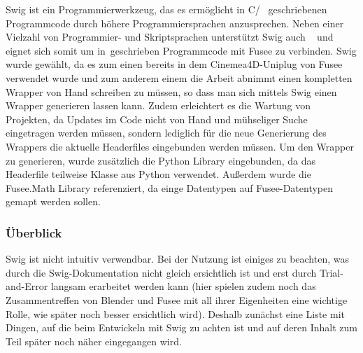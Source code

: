  \label{sec:Umsetzung}



\label{sec:SWIG}

Swig ist ein Programmierwerkzeug, das es ermöglicht in C/\CC~ geschriebenen Programmcode durch höhere Programmiersprachen anzusprechen. Neben einer Vielzahl von Programmier- und Skriptsprachen unterstützt Swig auch \CS~ und eignet sich somit um in\CC~geschrieben Programmcode mit Fusee zu verbinden. Swig wurde gewählt, da es zum einen bereits in dem Cinemea4D-Uniplug von Fusee verwendet wurde und zum anderem einem die Arbeit abnimmt einen kompletten Wrapper von Hand schreiben zu müssen, so dass man sich mittels Swig einen Wrapper generieren lassen kann. Zudem erleichtert es die Wartung von Projekten, da Updates im Code nicht von Hand und mühseliger Suche eingetragen werden müssen, sondern lediglich für die neue Generierung des Wrappers die aktuelle Headerfiles eingebunden werden müssen.
Um den Wrapper zu generieren, wurde zusätzlich die Python Library eingebunden, da das Headerfile teilweise Klasse aus Python verwendet. Außerdem wurde die Fusee.Math Library referenziert, da einge Datentypen auf Fusee-Datentypen gemapt werden sollen.

\subsubsection{Überblick}
Swig ist nicht intuitiv verwendbar. Bei der Nutzung ist einiges zu beachten, was durch die Swig-Dokumentation nicht gleich ersichtlich ist und erst durch Trial-and-Error langsam erarbeitet werden kann (hier spielen zudem noch das Zusammentreffen von Blender und Fusee mit all ihrer Eigenheiten eine wichtige Rolle, wie später noch besser ersichtlich wird). Deshalb zunächst eine Liste mit Dingen, auf die beim Entwickeln mit Swig zu achten ist und auf deren Inhalt zum Teil später noch näher eingegangen wird.

